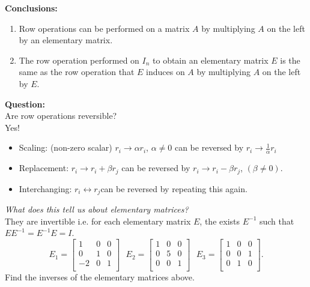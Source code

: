 \documentclass{report}
\begin{document}
\textbf{Conclusions:}\\
\begin{enumerate}[label=(\roman*)]
  \item Row operations can be performed on a matrix $A$ by multiplying $ A$ on the left by an elementary matrix.
  \item The row operation performed on $I_n$ to obtain an elementary matrix  $E$ is the same as the row operation that $E$ induces on $A$ by multiplying $A$  on the left by $E$.\\
  \end{enumerate}
  \textbf{Question:}\\
  Are row operations reversible?\\
  Yes!\\
  \begin{itemize}
          \item Scaling: (non-zero scalar) 
                  $r_i \to \alpha r_i $,  $\alpha \neq 0 $ can be reversed by $r_i \to \frac{1}{\alpha }r_i$
          \item Replacement: $r_i \to r_i + \beta r_j$ can be reversed by  $r_i \to r_i - \beta r_j$, $\left( \beta \neq 0 \right) $.
          \item Interchanging: $r_i \leftrightarrow r_j$can be reversed by repeating this again. 
  \end{itemize}
  \textit{What does this tell us about elementary matrices?} \\
  They are invertible i.e.  for each elementary matrix $E$, the exists $E^{-1}$ such that $E E^{-1}= E^{-1}E=I$.
\[
E_1 = \begin{bmatrix}
1 & 0 & 0\\
0 & 1 & 0\\
-2 & 0 & 1\\
\end{bmatrix} \text{ } E_2 = \begin{bmatrix}
1 & 0 & 0\\
0 & 5 & 0\\
0 & 0 & 1\\
\end{bmatrix} \text{ } E_3 = \begin{bmatrix}
1 & 0 & 0\\
0 & 0 & 1\\
0 & 1 & 0\\
\end{bmatrix}
.\] Find the inverses of the elementary matrices above.\\
\end{document}
